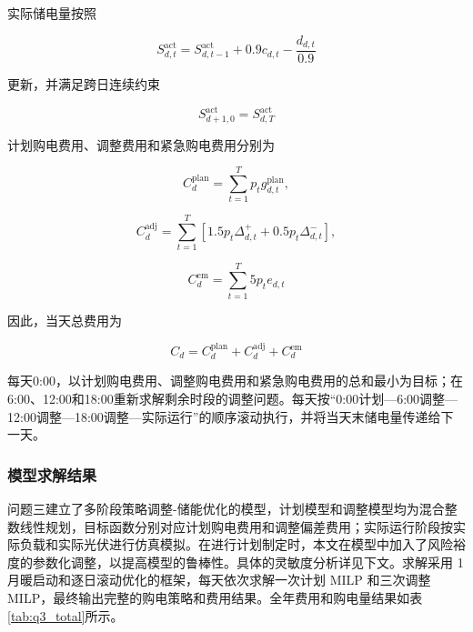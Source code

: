 \documentclass[UTF8]{ctexart}
\begin{document}
    实际储电量按照
    
    \begin{equation}
        S_{d,t}^{\mathrm{act}} = S_{d,t-1}^{\mathrm{act}} + 0.9c_{d,t} - \frac{d_{d,t}}{0.9}
    \end{equation}
    
    更新，并满足跨日连续约束
    
    \begin{equation}
        S_{d + 1,0}^{\mathrm{act}} = S_{d,T}^{\mathrm{act}}
    \end{equation}
    
    计划购电费用、调整费用和紧急购电费用分别为
    
    \begin{equation}
        C_d^{\mathrm{plan}} = \sum_{t = 1}^{T}p_tg_{d,t}^{\mathrm{plan}},
    \end{equation}
    
    \begin{equation}
        C_d^{\mathrm{adj}} = \sum_{t = 1}^{T} \left[ 1.5p_t\Delta_{d,t}^{+} + 0.5p_t\Delta_{d,t}^{-} \right],
    \end{equation}
    
    \begin{equation}
        C_d^{\mathrm{em}} = \sum_{t = 1}^{T}5p_te_{d,t}
    \end{equation}
    
    因此，当天总费用为
    
    \begin{equation}
        C_d=C_d^{\mathrm{plan}}+C_d^{\mathrm{adj}}+C_d^{\mathrm{em}}
    \end{equation}
    
    每天0:00，以计划购电费用、调整购电费用和紧急购电费用的总和最小为目标；在6:00、12:00和18:00重新求解剩余时段的调整问题。每天按“0:00计划—6:00调整—12:00调整—18:00调整—实际运行”的顺序滚动执行，并将当天末储电量传递给下一天。\par
    
    \subsubsection{模型求解结果}
    
    问题三建立了多阶段策略调整-储能优化的模型，计划模型和调整模型均为混合整数线性规划，目标函数分别对应计划购电费用和调整偏差费用；实际运行阶段按实际负载和实际光伏进行仿真模拟。在进行计划制定时，本文在模型中加入了风险裕度的参数化调整，以提高模型的鲁棒性。具体的灵敏度分析详见下文。求解采用 1 月暖启动和逐日滚动优化的框架，每天依次求解一次计划 MILP 和三次调整 MILP，最终输出完整的购电策略和费用结果。全年费用和购电量结果如表\ref{tab:q3_total}所示。
    
\end{document}
